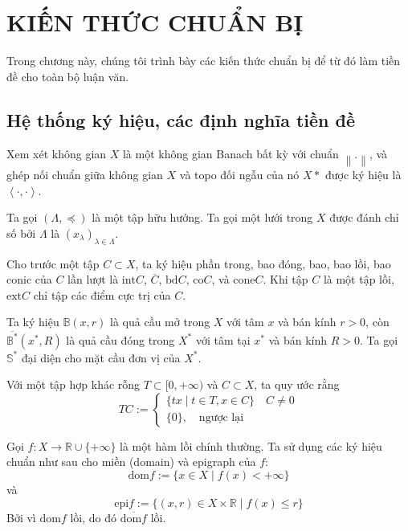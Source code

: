 \chapter{KIẾN THỨC CHUẨN BỊ}

Trong chương này, chúng tôi trình bày các kiến thức chuẩn bị để từ đó làm tiền đề cho toàn bộ luận văn.


\section{Hệ thống ký hiệu, các định nghĩa tiền đề}

Xem xét không gian $X$ là một không gian Banach bất kỳ với chuẩn $\left \| . \right \|$, và ghép nối chuẩn giữa không gian $X$ và topo đối ngẫu của nó $X*$ được ký hiệu là $\left \langle \cdot, \cdot \right \rangle$. 

Ta gọi $(\varLambda ,\preccurlyeq)$ là một tập hữu hướng. Ta gọi một lưới trong $X$ được đánh chỉ số bởi $\varLambda$ là $(x_{\lambda})_{\lambda \in \varLambda}$.

Cho trước một tập $C \subset X$, ta ký hiệu phần trong, bao đóng, bao, bao lồi, bao conic của $C$ lần lượt là $\text{int}C$, $\overline{C}$, $\text{bd}C$, $\text{co}C$, và $\text{cone}C$. Khi tập $C$ là một tập lồi, $\text{ext}C$ chỉ tập các điểm cực trị của $C$.

Ta ký hiệu $\mathbb{B}(x, r)$ là quả cầu mở trong $X$ với tâm $x$ và bán kính $r > 0$, còn $\overline{\mathbb{B}^{*}}(x^{*}, R)$ là quả cầu đóng trong $X^{*}$ với tâm tại $x^{*}$ và bán kính $R > 0$. Ta gọi $\mathbb{S}^{*}$ đại diện cho mặt cầu đơn vị của $X^{*}$. 

Với một tập hợp khác rỗng $T \subset [0, + \infty)$ và $C \subset X$, ta quy ước rằng 
\begin{equation}
    TC := \begin{cases}
        \{tx \mid t \in T, x \in C\}\quad C \ne 0 \\ 
        \{ 0\}, \quad\text{ngược lại}
    \end{cases}
\end{equation}

Gọi $f: X \rightarrow \mathbb{R} \cup \{+\infty\}$ là một hàm lồi chính thường. Ta sử dụng các ký hiệu chuẩn như sau cho miền (domain) và epigraph của $f$:
\begin{equation}
    \text{dom}f := \{x \in X \mid f(x) < +\infty\}
\end{equation} 
và
\begin{equation}
    \text{epi}f := \{(x, r) \in X \times \mathbb{R} \mid f(x) \leq r\}
\end{equation}
Bởi vì $\text{dom}f$ lồi, do đó $\overline{\text{dom}f}$ lồi. 

